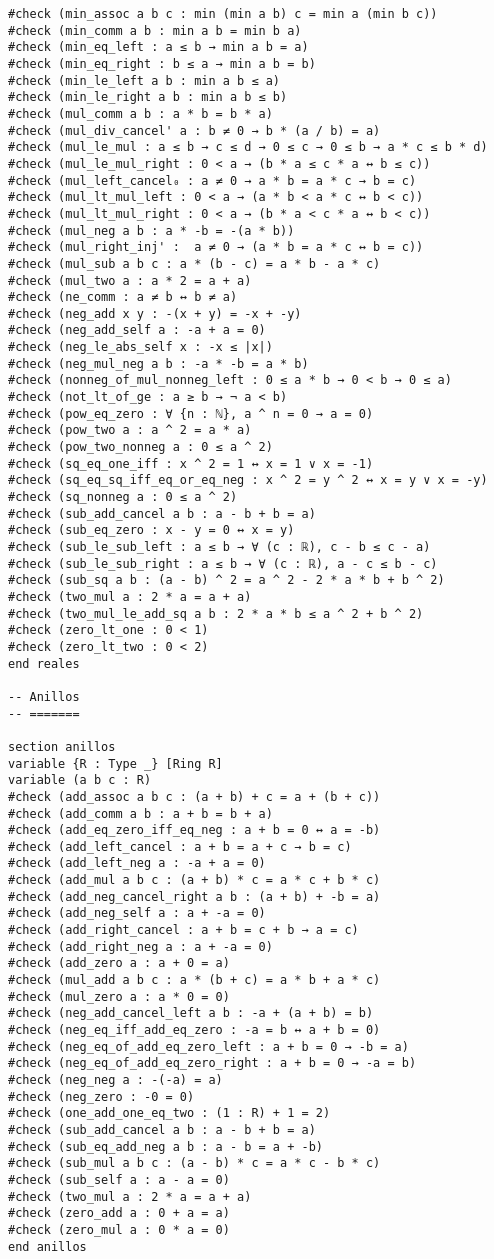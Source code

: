 \begin{verbatim}
#check (min_assoc a b c : min (min a b) c = min a (min b c))
#check (min_comm a b : min a b = min b a)
#check (min_eq_left : a ≤ b → min a b = a)
#check (min_eq_right : b ≤ a → min a b = b)
#check (min_le_left a b : min a b ≤ a)
#check (min_le_right a b : min a b ≤ b)
#check (mul_comm a b : a * b = b * a)
#check (mul_div_cancel' a : b ≠ 0 → b * (a / b) = a)
#check (mul_le_mul : a ≤ b → c ≤ d → 0 ≤ c → 0 ≤ b → a * c ≤ b * d)
#check (mul_le_mul_right : 0 < a → (b * a ≤ c * a ↔ b ≤ c))
#check (mul_left_cancel₀ : a ≠ 0 → a * b = a * c → b = c)
#check (mul_lt_mul_left : 0 < a → (a * b < a * c ↔ b < c))
#check (mul_lt_mul_right : 0 < a → (b * a < c * a ↔ b < c))
#check (mul_neg a b : a * -b = -(a * b))
#check (mul_right_inj' :  a ≠ 0 → (a * b = a * c ↔ b = c))
#check (mul_sub a b c : a * (b - c) = a * b - a * c)
#check (mul_two a : a * 2 = a + a)
#check (ne_comm : a ≠ b ↔ b ≠ a)
#check (neg_add x y : -(x + y) = -x + -y)
#check (neg_add_self a : -a + a = 0)
#check (neg_le_abs_self x : -x ≤ |x|)
#check (neg_mul_neg a b : -a * -b = a * b)
#check (nonneg_of_mul_nonneg_left : 0 ≤ a * b → 0 < b → 0 ≤ a)
#check (not_lt_of_ge : a ≥ b → ¬ a < b)
#check (pow_eq_zero : ∀ {n : ℕ}, a ^ n = 0 → a = 0)
#check (pow_two a : a ^ 2 = a * a)
#check (pow_two_nonneg a : 0 ≤ a ^ 2)
#check (sq_eq_one_iff : x ^ 2 = 1 ↔ x = 1 ∨ x = -1)
#check (sq_eq_sq_iff_eq_or_eq_neg : x ^ 2 = y ^ 2 ↔ x = y ∨ x = -y)
#check (sq_nonneg a : 0 ≤ a ^ 2)
#check (sub_add_cancel a b : a - b + b = a)
#check (sub_eq_zero : x - y = 0 ↔ x = y)
#check (sub_le_sub_left : a ≤ b → ∀ (c : ℝ), c - b ≤ c - a)
#check (sub_le_sub_right : a ≤ b → ∀ (c : ℝ), a - c ≤ b - c)
#check (sub_sq a b : (a - b) ^ 2 = a ^ 2 - 2 * a * b + b ^ 2)
#check (two_mul a : 2 * a = a + a)
#check (two_mul_le_add_sq a b : 2 * a * b ≤ a ^ 2 + b ^ 2)
#check (zero_lt_one : 0 < 1)
#check (zero_lt_two : 0 < 2)
end reales

-- Anillos
-- =======

section anillos
variable {R : Type _} [Ring R]
variable (a b c : R)
#check (add_assoc a b c : (a + b) + c = a + (b + c))
#check (add_comm a b : a + b = b + a)
#check (add_eq_zero_iff_eq_neg : a + b = 0 ↔ a = -b)
#check (add_left_cancel : a + b = a + c → b = c)
#check (add_left_neg a : -a + a = 0)
#check (add_mul a b c : (a + b) * c = a * c + b * c)
#check (add_neg_cancel_right a b : (a + b) + -b = a)
#check (add_neg_self a : a + -a = 0)
#check (add_right_cancel : a + b = c + b → a = c)
#check (add_right_neg a : a + -a = 0)
#check (add_zero a : a + 0 = a)
#check (mul_add a b c : a * (b + c) = a * b + a * c)
#check (mul_zero a : a * 0 = 0)
#check (neg_add_cancel_left a b : -a + (a + b) = b)
#check (neg_eq_iff_add_eq_zero : -a = b ↔ a + b = 0)
#check (neg_eq_of_add_eq_zero_left : a + b = 0 → -b = a)
#check (neg_eq_of_add_eq_zero_right : a + b = 0 → -a = b)
#check (neg_neg a : -(-a) = a)
#check (neg_zero : -0 = 0)
#check (one_add_one_eq_two : (1 : R) + 1 = 2)
#check (sub_add_cancel a b : a - b + b = a)
#check (sub_eq_add_neg a b : a - b = a + -b)
#check (sub_mul a b c : (a - b) * c = a * c - b * c)
#check (sub_self a : a - a = 0)
#check (two_mul a : 2 * a = a + a)
#check (zero_add a : 0 + a = a)
#check (zero_mul a : 0 * a = 0)
end anillos


\end{verbatim}
